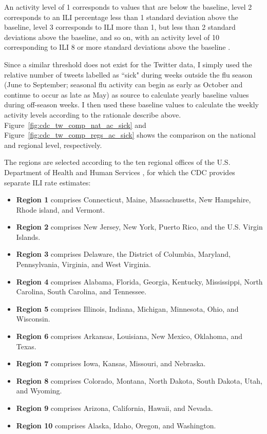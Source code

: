 \documentclass[11pt, a4paper,twoside]{report}\usepackage[]{graphicx}\usepackage[]{color}
\begin{document}
An activity level of 1 corresponds to values that are below the baseline, level 2 corresponds to an ILI percentage less than 1 standard deviation above the baseline, level 3 corresponds to ILI more than 1, but less than 2 standard deviations above the baseline, and so on, with an activity level of 10 corresponding to ILI 8 or more standard deviations above the baseline \citep{cdc_surveillance_2016}.
  
Since a similar threshold does not exist for the Twitter data, I simply used the relative number of tweets labelled as ``sick" during weeks outside the flu season (June to September; seasonal flu activity can begin as early as October and continue to occur as late as May) as source to calculate yearly baseline values during off-season weeks. I then used these baseline values to calculate the weekly activity levels according to the rationale describe above. Figure~\ref{fig:cdc_tw_comp_nat_ac_sick} and Figure~\ref{fig:cdc_tw_comp_regs_ac_sick} shows the comparison on the national and regional level, respectively. 

The regions are selected according to the ten regional offices of the U.S. Department of Health and Human Services \citep{hhs_offices_2014}, for which the CDC provides separate ILI rate estimates: 

\begin{itemize}
\item \textbf{Region 1} comprises Connecticut, Maine, Massachusetts, New Hampshire, Rhode island, and Vermont.
\item \textbf{Region 2} comprises New Jersey, New York, Puerto Rico, and the U.S. Virgin Islands.
\item \textbf{Region 3} comprises Delaware, the District of Columbia, Maryland, Pennsylvania, Virginia, and West Virginia.
\item \textbf{Region 4} comprises Alabama, Florida, Georgia, Kentucky, Mississippi, North Carolina, South Carolina, and Tennessee.
\item \textbf{Region 5} comprises Illinois, Indiana, Michigan, Minnesota, Ohio, and Wisconsin.
\item \textbf{Region 6} comprises Arkansas, Louisiana, New Mexico, Oklahoma, and Texas.
\item \textbf{Region 7} comprises Iowa, Kansas, Missouri, and Nebraska.
\item \textbf{Region 8} comprises Colorado, Montana, North Dakota, South Dakota, Utah, and Wyoming.
\item \textbf{Region 9} comprises Arizona, California, Hawaii, and Nevada.
\item \textbf{Region 10} comprises Alaska, Idaho, Oregon, and Washington.
\end{itemize}
\end{document}
